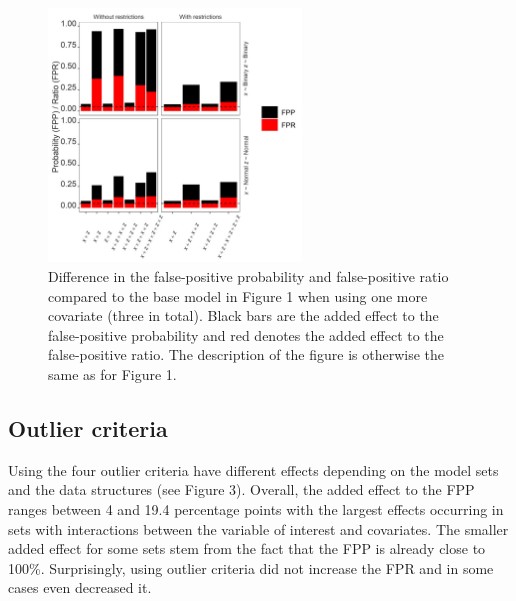 \begin{figure}[hbt!]
\includegraphics[width=0.6\textwidth]{R/Analysis/Result/Figures/Figure1C.jpeg}
\centering
\caption{Difference in the false-positive probability and false-positive ratio compared to the base model in Figure 1 when using one more covariate (three in total). Black bars are the added effect to the false-positive probability and red denotes the added effect to the false-positive ratio. The description of the figure is otherwise the same as for Figure 1.}
\label{fig:mainfigure}
\end{figure}

\subsection{Outlier criteria}
Using the four outlier criteria have different effects depending on the model sets and the data structures (see Figure 3). Overall, the added effect to the FPP ranges between 4 and 19.4 percentage points with the largest effects occurring in sets with interactions between the variable of interest and covariates. The smaller added effect for some sets stem from the fact that the FPP is already close to 100\%.  Surprisingly, using outlier criteria did not increase the FPR and in some cases even decreased it. 

